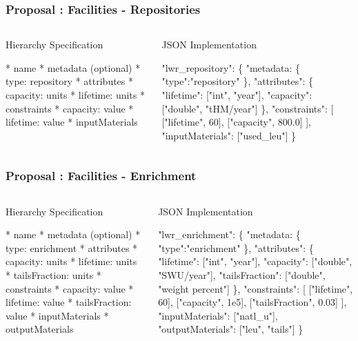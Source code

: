 \begin{frame}[fragile]
  \frametitle{Proposal : Facilities - Repositories}
  \begin{columns}[t]
    \begin{block}{Hierarchy Specification}\begin{small}\begin{semiverbatim}
* name
  * metadata (optional)
    * type: repository
  * attributes
    * capacity: units
    * lifetime: units
  * constraints
    * capacity: value
    * lifetime: value
  * inputMaterials
    \end{semiverbatim}\end{small}\end{block}
    \begin{block}{JSON Implementation}\begin{small}\begin{semiverbatim}
"lwr_repository": \{
  "metadata: \{
    "type":"repository"
  \},
  "attributes": \{
    "lifetime": ["int", "year"], 
    "capacity": ["double", "tHM/year"]
  \},
  "constraints": [
    ["lifetime", 60], 
    ["capacity", 800.0]
   ], 
 "inputMaterials": ["used_leu"]
\}
    \end{semiverbatim}\end{small}\end{block}
  \end{columns}
\end{frame}

\begin{frame}[fragile]
  \frametitle{Proposal : Facilities - Enrichment}
  \begin{columns}[t]
    \begin{block}{Hierarchy Specification}\begin{footnotesize}\begin{semiverbatim}
* name
  * metadata (optional)
    * type: enrichment
  * attributes
    * capacity: units
    * lifetime: units
    * tailsFraction: units
  * constraints
    * capacity: value
    * lifetime: value
    * tailsFraction: value
  * inputMaterials
  * outputMaterials
    \end{semiverbatim}\end{footnotesize}\end{block}
    \begin{block}{JSON Implementation}\begin{footnotesize}\begin{semiverbatim}
"lwr_enrichment": \{
  "metadata: \{
    "type":"enrichment"
  \},
  "attributes": \{
    "lifetime": ["int", "year"], 
    "capacity": ["double", "SWU/year"],
    "tailsFraction": ["double", 
                      "weight percent"]
  \},
  "constraints": [
    ["lifetime", 60], 
    ["capacity", 1e5],
    ["tailsFraction", 0.03]
  ], 
  "inputMaterials": ["natl_u"],
  "outputMaterials": ["leu", "tails"]
\}
    \end{semiverbatim}\end{footnotesize}\end{block}
  \end{columns}
\end{frame}


